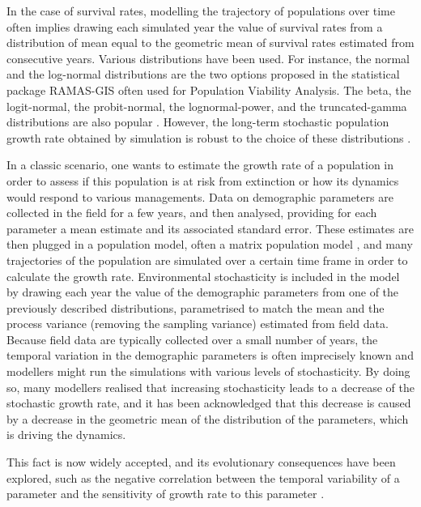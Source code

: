 \documentclass[preprint,authoryear,12pt]{elsarticle}
\begin{document}
In the case of survival rates, modelling the trajectory of populations
over time often implies drawing each simulated year the value of
survival rates from a distribution of mean equal to the geometric mean
of survival rates estimated from consecutive years. Various
distributions have been used. For instance, the normal \citep[e.g.,
][]{winemiller_life_2002} and the log-normal distributions are the two
options proposed in the statistical package RAMAS-GIS
\citep{akcakaya_ramas_2002} often used for Population Viability
Analysis. The beta, the logit-normal, the probit-normal, the
lognormal-power, and the truncated-gamma distributions are also
popular \citep{kaye_effect_2003,samaranayaka_modelling_2010}. However,
the long-term stochastic population growth rate obtained by simulation
is robust to the choice of these distributions
\citep{samaranayaka_modelling_2010}.

In a classic scenario, one wants to estimate the growth rate of a
population in order to assess if this population is at risk from
extinction or how its dynamics would respond to various
managements. Data on demographic parameters are collected in the field
for a few years, and then analysed, providing for each parameter a
mean estimate and its associated standard error. These estimates are
then plugged in a population model, often a matrix population model
\citep{caswell_matrix_2001}, and many trajectories of the population
are simulated over a certain time frame in order to calculate the
growth rate. Environmental stochasticity is included in the model by
drawing each year the value of the demographic parameters from one of
the previously described distributions, parametrised to match the mean
and the process variance (removing the sampling variance) estimated
from field data. Because field data are typically collected over a
small number of years, the temporal variation in the demographic
parameters is often imprecisely known and modellers might run the
simulations with various levels of stochasticity. By doing so, many
modellers realised that increasing stochasticity leads to a decrease
of the stochastic growth rate, and it has been acknowledged that this
decrease is caused by a decrease in the geometric mean of the
distribution of the parameters, which is driving the dynamics.

This fact is now widely accepted, and its evolutionary consequences
have been explored, such as the negative correlation between the
temporal variability of a parameter and the sensitivity of growth rate
to this parameter \citep{pfister_patterns_1998}. 
\end{document}
